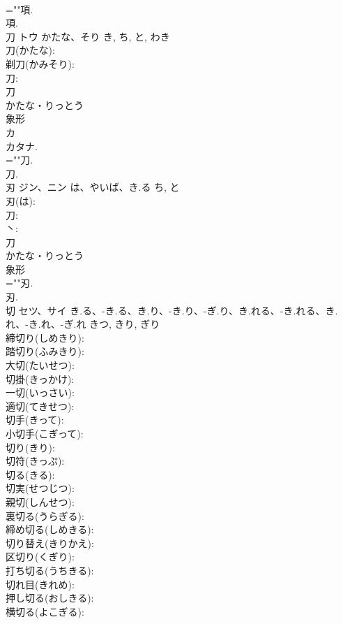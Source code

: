 \documentclass[8pt]{extreport}
\begin{document}
\begin{CJK}{UTF8}{min}
\\	=""項.
\\	項.
\\	刀	トウ	かたな、そり	き, ち, と, わき	
\\	刀(かたな): 
\\	剃刀(かみそり): 
\\	刀: 
\\	刀	
\\	かたな・りっとう	
\\	象形 
\\	カ 
\\	カタナ.	
\\	=""刀.
\\	刀.
\\	刃	ジン、ニン	は、やいば、き.る	ち, と	
\\	刃(は): 
\\	刀: 
\\	丶: 
\\	刀	
\\	かたな・りっとう	
\\	象形 
\\	=""刃.
\\	刃.
\\	切	セツ、サイ	き.る、-き.る、き.り、-き.り、-ぎ.り、き.れる、-き.れる、き.れ、-き.れ、-ぎ.れ	きつ, きり, ぎり	
\\	締切り(しめきり): 
\\	踏切り(ふみきり): 
\\	大切(たいせつ): 
\\	切掛(きっかけ): 
\\	一切(いっさい): 
\\	適切(てきせつ): 
\\	切手(きって): 
\\	小切手(こぎって): 
\\	切り(きり): 
\\	切符(きっぷ): 
\\	切る(きる): 
\\	切実(せつじつ): 
\\	親切(しんせつ): 
\\	裏切る(うらぎる): 
\\	締め切る(しめきる): 
\\	切り替え(きりかえ): 
\\	区切り(くぎり): 
\\	打ち切る(うちきる): 
\\	切れ目(きれめ): 
\\	押し切る(おしきる): 
\\	横切る(よこぎる): 

\end{CJK}
\end{document}

